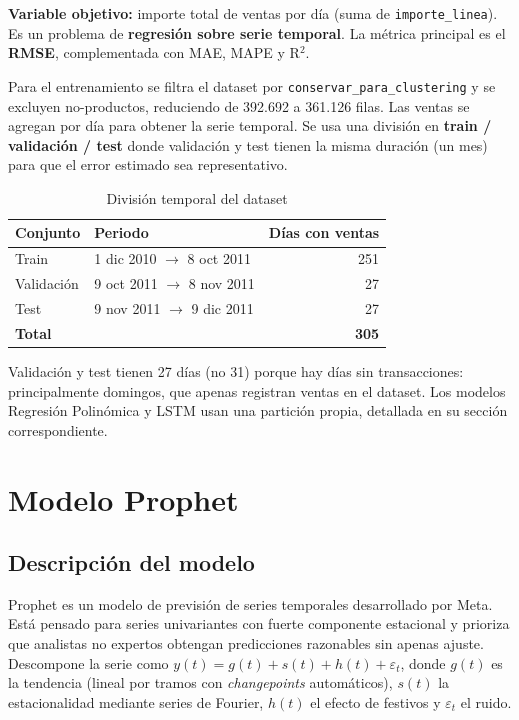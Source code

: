 \documentclass[11pt,a4paper]{article}
\begin{document}
\textbf{Variable objetivo:} importe total de ventas por día (suma de \texttt{importe\_linea}). Es un problema de \textbf{regresión sobre serie temporal}. La métrica principal es el \textbf{RMSE}, complementada con MAE, MAPE y R$^2$.

Para el entrenamiento se filtra el dataset por \texttt{conservar\_para\_clustering} y se excluyen no-productos, reduciendo de 392.692 a 361.126 filas. Las ventas se agregan por día para obtener la serie temporal. Se usa una división en \textbf{train / validación / test} donde validación y test tienen la misma duración (un mes) para que el error estimado sea representativo.

\begin{table}[h]
\centering
\caption{División temporal del dataset}
\begin{tabular}{llr}
\toprule
\textbf{Conjunto} & \textbf{Periodo} & \textbf{Días con ventas} \\
\midrule
Train & 1 dic 2010 $\rightarrow$ 8 oct 2011 & 251 \\
Validación & 9 oct 2011 $\rightarrow$ 8 nov 2011 & 27 \\
Test & 9 nov 2011 $\rightarrow$ 9 dic 2011 & 27 \\
\midrule
\textbf{Total} & & \textbf{305} \\
\bottomrule
\end{tabular}
\end{table}

Validación y test tienen 27 días (no 31) porque hay días sin transacciones: principalmente domingos, que apenas registran ventas en el dataset. Los modelos Regresión Polinómica y LSTM usan una partición propia, detallada en su sección correspondiente.

\section{Modelo Prophet}

\subsection{Descripción del modelo}

Prophet es un modelo de previsión de series temporales desarrollado por Meta. Está pensado para series univariantes con fuerte componente estacional y prioriza que analistas no expertos obtengan predicciones razonables sin apenas ajuste. Descompone la serie como $y(t) = g(t) + s(t) + h(t) + \varepsilon_t$, donde $g(t)$ es la tendencia (lineal por tramos con \textit{changepoints} automáticos), $s(t)$ la estacionalidad mediante series de Fourier, $h(t)$ el efecto de festivos y $\varepsilon_t$ el ruido.
\end{document}
